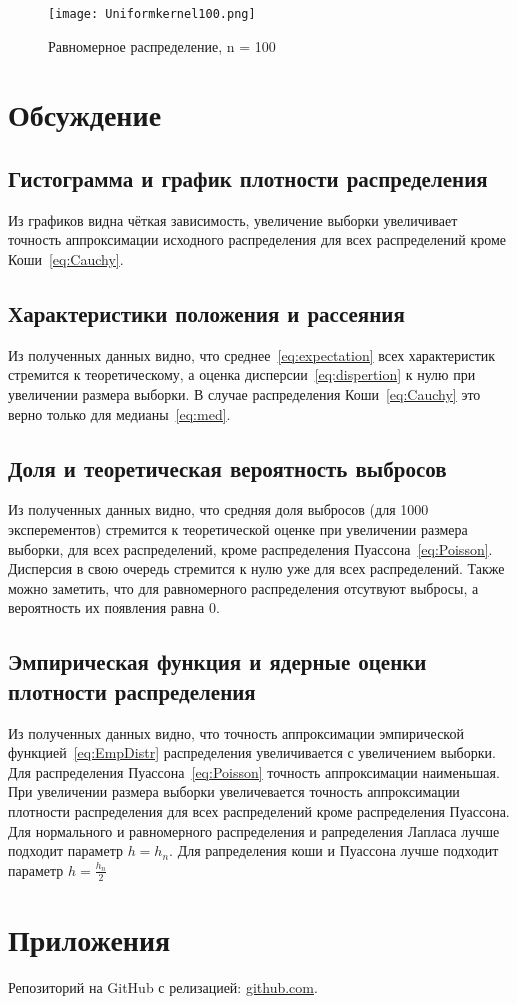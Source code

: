 \documentclass[12pt,a4paper]{scrartcl}
\begin{document}
\begin{figure}[H]
  \centering
  \texttt{[image: Uniformkernel100.png]}
  \caption{Равномерное распределение, n = 100}
\end{figure}


\section{Обсуждение}
\subsection{Гистограмма и график плотности распределения}

Из графиков видна чёткая зависимость, увеличение выборки увеличивает точность аппроксимации исходного распределения для всех распределений кроме Коши~\eqref{eq:Cauchy}.

\subsection{Характеристики положения и рассеяния}

Из полученных данных видно, что среднее~\eqref{eq:expectation} всех характеристик стремится к теоретическому, а оценка дисперсии~\eqref{eq:dispertion} к нулю при увеличении размера выборки. В случае распределения Коши~\eqref{eq:Cauchy} это верно только для медианы~\eqref{eq:med}.

\subsection{Доля и теоретическая вероятность выбросов}

Из полученных данных видно, что средняя доля выбросов (для 1000 эксперементов) стремится к теоретической оценке при увеличении размера выборки, для всех распределений, кроме распределения Пуассона~\eqref{eq:Poisson}. Дисперсия в свою очередь стремится к нулю уже для всех распределений. Также можно заметить, что для равномерного распределения отсутвуют выбросы, а вероятность их появления равна 0.

\subsection{Эмпирическая функция и ядерные оценки плотности распределения}

Из полученных данных видно, что точность аппроксимации эмпирической функцией~\eqref{eq:EmpDistr} распределения увеличивается с увеличением выборки. Для распределения Пуассона~\eqref{eq:Poisson} точность аппроксимации наименьшая. При увеличении размера выборки увеличевается точность аппроксимации плотности распределения для всех распределений кроме распределения Пуассона. Для нормального и равномерного распределения и рапределения Лапласа лучше подходит параметр $h = h_n$. Для рапределения коши и Пуассона лучше подходит параметр $h = \frac{h_n}{2}$

\section{Приложения}
Репозиторий на GitHub с релизацией: \href{https://github.com/WiillyWonka/MatStat}{github.com}.
\end{document}

